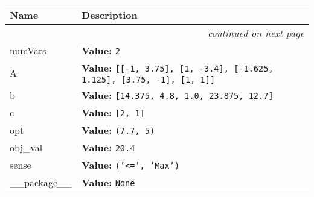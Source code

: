     \vspace{-1cm}
\hspace{\varindent}\begin{longtable}{|p{\varnamewidth}|p{\vardescrwidth}|l}
\cline{1-2}
\cline{1-2} \centering \textbf{Name} & \centering \textbf{Description}& \\
\cline{1-2}
\endhead\cline{1-2}\multicolumn{3}{r}{\small\textit{continued on next page}}\\\endfoot\cline{1-2}
\endlastfoot\raggedright n\-u\-m\-V\-a\-r\-s\- & \raggedright \textbf{Value:} 
{\tt 2}&\\
\cline{1-2}
\raggedright A\- & \raggedright \textbf{Value:} 
{\tt \texttt{[}\texttt{[}-1\texttt{, }3.75\texttt{]}\texttt{, }\texttt{[}1\texttt{, }-3.4\texttt{]}\texttt{, }\texttt{[}-1.625\texttt{, }1.125\texttt{]}\texttt{, }\texttt{[}3.75\texttt{, }-1\texttt{]}\texttt{, }\texttt{[}1\texttt{, }1\texttt{]}\texttt{]}}&\\
\cline{1-2}
\raggedright b\- & \raggedright \textbf{Value:} 
{\tt \texttt{[}14.375\texttt{, }4.8\texttt{, }1.0\texttt{, }23.875\texttt{, }12.7\texttt{]}}&\\
\cline{1-2}
\raggedright c\- & \raggedright \textbf{Value:} 
{\tt \texttt{[}2\texttt{, }1\texttt{]}}&\\
\cline{1-2}
\raggedright o\-p\-t\- & \raggedright \textbf{Value:} 
{\tt \texttt{(}7.7\texttt{, }5\texttt{)}}&\\
\cline{1-2}
\raggedright o\-b\-j\-\_\-v\-a\-l\- & \raggedright \textbf{Value:} 
{\tt 20.4}&\\
\cline{1-2}
\raggedright s\-e\-n\-s\-e\- & \raggedright \textbf{Value:} 
{\tt \texttt{(}\texttt{'}\texttt{{\textless}=}\texttt{'}\texttt{, }\texttt{'}\texttt{Max}\texttt{'}\texttt{)}}&\\
\cline{1-2}
\raggedright \_\-\_\-p\-a\-c\-k\-a\-g\-e\-\_\-\_\- & \raggedright \textbf{Value:} 
{\tt None}&\\
\cline{1-2}
\end{longtable}

